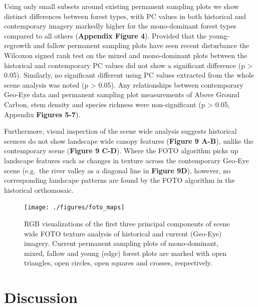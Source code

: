 \documentclass[remote sensing,article,submit,moreauthors,pdftex]{mdpi}
\begin{document}
Using only small subsets around existing permanent sampling plots we
show distinct differences between forest types, with PC values in both
historical and contemporary imagery markedly higher for the
mono-dominant forest types compared to all others (\textbf{Appendix
Figure 4}). Provided that the young-regrowth and fallow permanent
sampling plots have seen recent disturbance the Wilcoxon signed rank
test on the mixed and mono-dominant plots between the historical and
contemporary PC values did not show a significant difference (p
\textgreater{} 0.05). Similarly, no significant different using PC
values extracted from the whole scene analysis was noted (p
\textgreater{} 0.05). Any relationships between contemporary Geo-Eye
data and permanent sampling plot measurements of Above Ground Carbon,
stem density and species richness were non-significant (p \textgreater{}
0.05, Appendix \textbf{Figures 5-7}).

Furthermore, visual inspection of the scene wide analysis suggests
historical scences do not show landscape wide canopy features
(\textbf{Figure 9 A-B}), unlike the contemporary scene (\textbf{Figure 9
C-D}). Where the FOTO algorithm picks up landscape features such as
changes in texture across the contemporary Geo-Eye scene (e.g.~the river
valley as a diagonal line in \textbf{Figure 9D}), however, no
corresponding landscape patterns are found by the FOTO algorithm in the
historical orthomosaic.

\begin{figure}

{\centering \texttt{[image: ./figures/foto\_maps]} 

}

\caption{RGB visualizations of the first three principal components of scene wide FOTO texture analysis of historical and current (Geo-Eye) imagery. Current permanent sampling plots of mono-dominant, mixed, fallow and young (edge) forest plots are marked with open triangles, open circles, open squares and crosses, respectively.}\label{fig:unnamed-chunk-13}
\end{figure}

\hypertarget{discussion}{%
\section{Discussion}\label{discussion}}
\end{document}
